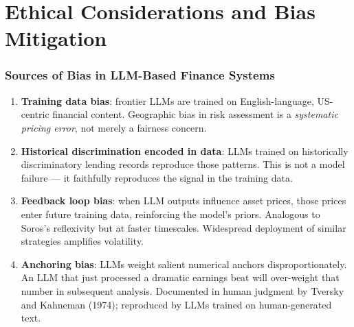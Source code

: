 \documentclass[9pt,t]{beamer}
\begin{document}
\section{Ethical Considerations and Bias Mitigation}

\begin{frame}
\frametitle{Sources of Bias in LLM-Based Finance Systems}

\begin{enumerate}
  \item \textbf{Training data bias}: frontier LLMs are trained on English-language, US-centric financial content. Geographic bias in risk assessment is a \emph{systematic pricing error}, not merely a fairness concern.

  \item \textbf{Historical discrimination encoded in data}: LLMs trained on historically discriminatory lending records reproduce those patterns. This is not a model failure — it faithfully reproduces the signal in the training data.

  \item \textbf{Feedback loop bias}: when LLM outputs influence asset prices, those prices enter future training data, reinforcing the model's priors. Analogous to Soros's reflexivity but at faster timescales. Widespread deployment of similar strategies amplifies volatility.

  \item \textbf{Anchoring bias}: LLMs weight salient numerical anchors disproportionately. An LLM that just processed a dramatic earnings beat will over-weight that number in subsequent analysis. Documented in human judgment by Tversky and Kahneman (1974); reproduced by LLMs trained on human-generated text.
\end{enumerate}
\end{frame}
\end{document}
